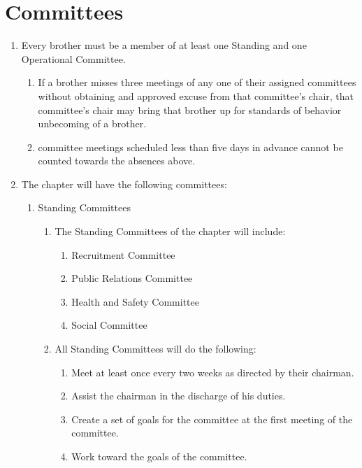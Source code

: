\section{Committees}
\label{committees}

\begin{enumerate}
	\item Every brother must be a member of at least one Standing and one Operational Committee.
    \begin{enumerate}
        \item If a brother misses three meetings of any one of their assigned committees without obtaining and approved excuse from that committee's chair, that committee's chair may bring that brother up for standards of behavior unbecoming of a brother.
        \item committee meetings scheduled less than five days in advance cannot be counted towards the absences above.
    \end{enumerate}
	\item The chapter will have the following committees:
		\begin{enumerate}	
			\item Standing Committees \label{standing-comm}
				\begin{enumerate}
					\item The Standing Committees of the chapter will include:

						\begin{enumerate}
							\item Recruitment Committee
							\item Public Relations Committee
							\item Health and Safety Committee
							\item Social Committee
						\end{enumerate}
					
					\item All Standing Committees will do the following:
						\begin{enumerate}
							\item Meet at least once every two weeks as directed by their chairman.
							\item Assist the chairman in the discharge of his duties.
							\item Create a set of goals for the committee at the first meeting of the committee.
							\item Work toward the goals of the committee.
						\end{enumerate}
				\end{enumerate}


\end{enumerate}
\end{enumerate}
